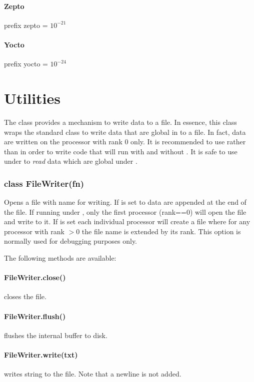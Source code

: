 \paragraph{Zepto}
prefix zepto = $10^{-21}$


\paragraph{Yocto}
prefix yocto = $10^{-24}$


\section{Utilities}
The  class provides a mechanism to write data to a file.
In essence, this class wraps the standard \PYTHON {} class to write
data that are global in \MPI to a file. In fact, data are written on the
processor with \MPI rank 0 only. It is recommended to use 
rather than  in order to write code that will run with and without
\MPI. It is safe to use  under \MPI to \emph{read} data which are
global under \MPI.

\subsubsection*{class FileWriter(fn)}
Opens a file with name  for writing. If  is set to \True
data are appended at the end of the file.
If running under \MPI, only the first processor (rank==0) will open the file
and write to it.
If  is set each individual processor will create a file
where for any processor with rank $> 0$ the file name is extended by its rank.
This option is normally used for debugging purposes only.


\vspace{1em}\noindent The following methods are available:
\paragraph{FileWriter.close()}
closes the file.

\paragraph{FileWriter.flush()}
flushes the internal buffer to disk.

\paragraph{FileWriter.write(txt)}
writes string  to the file. Note that a newline is not added.

